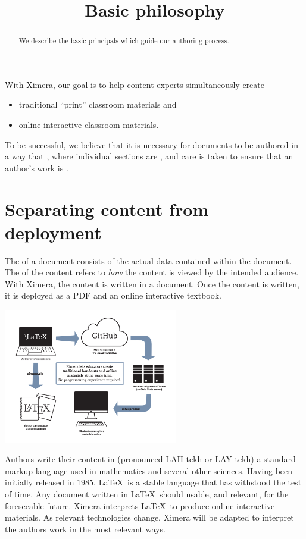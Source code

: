 \documentclass{ximera}
\title{Basic philosophy}
\begin{document}
\begin{abstract}
  We describe the basic principals which guide our authoring process.
\end{abstract}
\maketitle

With Ximera, our goal is to help content experts simultaneously create
\begin{itemize}
\item traditional ``print'' classroom materials and
\item online interactive classroom materials.
\end{itemize}
To be successful, we believe that it is necessary for documents to be
authored in a way that , where
individual sections are , and care is taken to ensure
that an author's work is .


\section{Separating content from deployment}

The  of a document consists of the actual data contained
within the document. The  of the content refers to
\textit{how} the content is viewed by the intended audience. With
Ximera, the content is written in a  document.
Once the content is written, it is deployed as a PDF and an online interactive textbook.
\begin{image}
\includegraphics[width=3in]{XimeraGraphic.png}
\end{image}
Authors write their content in
 (pronounced LAH-tekh
or LAY-tekh) a standard markup language used in mathematics and
several other sciences. Having been initially released in $1985$,
\LaTeX\ is a stable language that has withstood the test of time. Any
document written in \LaTeX\ should usable, and relevant, for the
foreseeable future. Ximera interprets \LaTeX\ to produce online
interactive materials. As relevant technologies change, Ximera will be
adapted to interpret the authors work in the most relevant ways.
\end{document}
